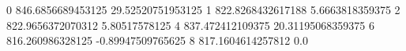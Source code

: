 0 846.6856689453125 29.52520751953125
1 822.8268432617188 5.6663818359375
2 822.9656372070312 5.80517578125
4 837.472412109375 20.31195068359375
6 816.260986328125 -0.89947509765625
8 817.1604614257812 0.0
